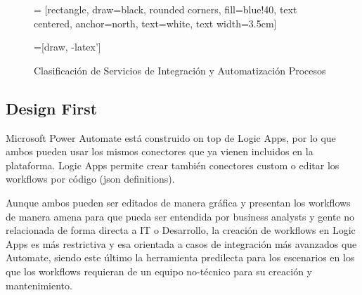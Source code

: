 \documentclass[a4paper]{article}
\begin{document}
    \begin{figure*}[b]
         = [rectangle, draw=black, rounded corners, fill=blue!40, text centered, anchor=north, text=white, text width=3.5cm]

        =[draw, -latex']

        \centering

        \caption{Clasificación de Servicios de Integración y Automatización Procesos}
    \end{figure*}

    \clearpage
    \subsection{Design First}

    Microsoft Power Automate está construido on top de Logic Apps, por lo que ambos pueden usar los mismos conectores que ya vienen incluidos en la plataforma. Logic Apps permite crear también conectores custom o editar los workflows por código (json definitions).

    Aunque ambos pueden ser editados de manera gráfica y presentan los workflows de manera amena para que pueda ser entendida por business analysts y gente no relacionada de forma directa a IT o Desarrollo, la creación de workflows en Logic Apps es más restrictiva y esa orientada a casos de integración más avanzados que Automate, siendo este último la herramienta predilecta para los escenarios en los que los workflows requieran de un equipo no-técnico para su creación y mantenimiento.
\end{document}

